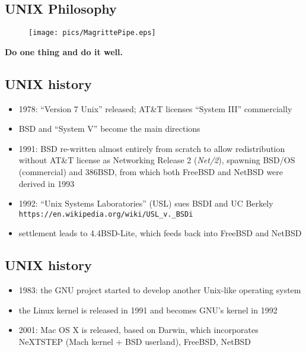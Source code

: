 \documentclass[xga]{xdvislides}
\begin{document}
\subsection{UNIX Philosophy}
\begin{figure}[hb]
	\begin{center}
		\texttt{[image: pics/MagrittePipe.eps]} \\
	\end{center}
\end{figure}
\begin{center}
	{\bf Do one thing and do it well.}
\end{center}




\subsection{UNIX history}
\begin{itemize}
	\item 1978: ``Version 7 Unix'' released; AT\&T licenses ``System III'' commercially
	\item BSD and ``System V'' become the main directions
	\item 1991: BSD re-written almost entirely from scratch to allow
		redistribution without AT\&T license as Networking Release 2 ({\em Net/2}),
		spawning BSD/OS (commercial) and 386BSD, from which both
		FreeBSD and NetBSD were derived in 1993
	\item 1992: ``Unix Systems Laboratories'' (USL) sues BSDI and UC Berkely \\
	      \small {\tt https://en.wikipedia.org/wiki/USL\_v.\_BSDi} \Normalsize
	\item settlement leads to 4.4BSD-Lite, which feeds back into
		FreeBSD and NetBSD
\end{itemize}

\subsection{UNIX history}
\begin{itemize}
	\item 1983: the GNU project started to develop another Unix-like operating system
	\item the Linux kernel is released in 1991 and becomes GNU's
		kernel in 1992
	\\

	\item 2001: Mac OS X is released, based on Darwin, which incorporates NeXTSTEP (Mach
		kernel + BSD userland), FreeBSD, NetBSD
\end{itemize}
\end{document}
